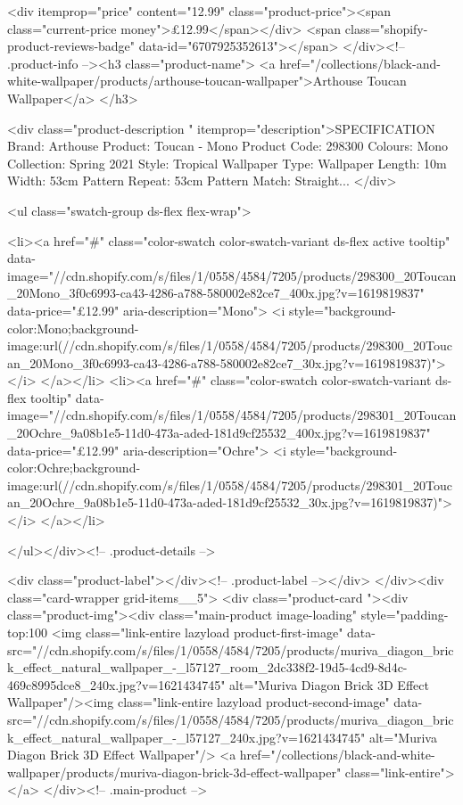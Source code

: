 {{{{{{{<div itemprop="price" content="12.99" class="product-price"><span class="current-price money">£12.99</span></div>
    <span class="shopify-product-reviews-badge" data-id="6707925352613"></span>
  </div><!-- .product-info --><h3 class="product-name">
      <a href="/collections/black-and-white-wallpaper/products/arthouse-toucan-wallpaper">Arthouse Toucan Wallpaper</a>
    </h3>
    
<div class="product-description " itemprop="description">SPECIFICATION Brand: Arthouse Product: Toucan - Mono Product Code: 298300 Colours: Mono Collection: Spring 2021 Style: Tropical Wallpaper Type: Wallpaper Length: 10m Width: 53cm Pattern Repeat: 53cm Pattern Match: Straight...
</div>



<ul class="swatch-group ds-flex flex-wrap">
        
<li><a href="#" class="color-swatch color-swatch-variant ds-flex active tooltip" data-image="//cdn.shopify.com/s/files/1/0558/4584/7205/products/298300_20Toucan_20Mono_3f0c6993-ca43-4286-a788-580002e82ce7_400x.jpg?v=1619819837" data-price="£12.99" aria-description="Mono">
              <i style="background-color:Mono;background-image:url(//cdn.shopify.com/s/files/1/0558/4584/7205/products/298300_20Toucan_20Mono_3f0c6993-ca43-4286-a788-580002e82ce7_30x.jpg?v=1619819837)"></i>
            </a></li>
<li><a href="#" class="color-swatch color-swatch-variant ds-flex tooltip" data-image="//cdn.shopify.com/s/files/1/0558/4584/7205/products/298301_20Toucan_20Ochre_9a08b1e5-11d0-473a-aded-181d9cf25532_400x.jpg?v=1619819837" data-price="£12.99" aria-description="Ochre">
              <i style="background-color:Ochre;background-image:url(//cdn.shopify.com/s/files/1/0558/4584/7205/products/298301_20Toucan_20Ochre_9a08b1e5-11d0-473a-aded-181d9cf25532_30x.jpg?v=1619819837)"></i>
            </a></li>

      </ul></div><!-- .product-details -->

<div class="product-label"></div><!-- .product-label --></div>
          </div><div class="card-wrapper grid-items__5">
            <div class="product-card "><div class="product-img"><div class="main-product image-loading" style="padding-top:100%
      <img class="link-entire lazyload product-first-image" data-src="//cdn.shopify.com/s/files/1/0558/4584/7205/products/muriva_diagon_brick_effect_natural_wallpaper_-_l57127_room_2dc338f2-19d5-4cd9-8d4c-469c8995dce8_240x.jpg?v=1621434745" alt="Muriva Diagon Brick 3D Effect Wallpaper"/><img class="link-entire lazyload product-second-image" data-src="//cdn.shopify.com/s/files/1/0558/4584/7205/products/muriva_diagon_brick_effect_natural_wallpaper_-_l57127_240x.jpg?v=1621434745" alt="Muriva Diagon Brick 3D Effect Wallpaper"/>
      <a href="/collections/black-and-white-wallpaper/products/muriva-diagon-brick-3d-effect-wallpaper" class="link-entire"></a>
    </div><!-- .main-product -->
  
}}}}}}}
